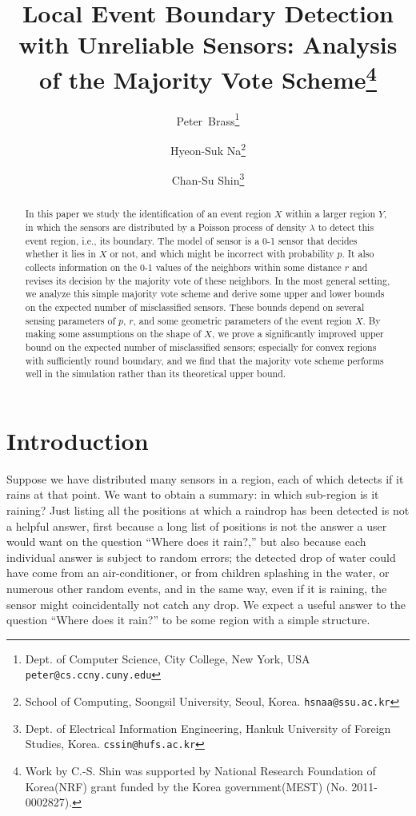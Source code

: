 \documentclass{article}
\begin{document}
\title{
Local Event Boundary Detection with Unreliable Sensors:
Analysis of the Majority Vote Scheme\thanks{Work by C.-S. Shin was supported by National Research Foundation of Korea(NRF) grant funded by the Korea government(MEST) (No. 2011-0002827).}}


\author{
	Peter~Brass\thanks{Dept. of Computer Science, City College, New York, USA \tt{peter@cs.ccny.cuny.edu}} \and 
	Hyeon-Suk Na\thanks{School of Computing, Soongsil University, Seoul, Korea. \tt{hsnaa@ssu.ac.kr}} 
	\and Chan-Su Shin\thanks{Dept. of Electrical Information Engineering, Hankuk University of Foreign Studies, Korea. \tt{cssin@hufs.ac.kr}}
}
\date{}
\maketitle

\begin{abstract}
In this paper we study the identification of an event region $X$ within a
larger region $Y$, in which the sensors are distributed by a Poisson process
of density $\lambda$ to detect this event region, i.e., its boundary. The model of sensor is a 0-1
sensor that decides whether it lies in $X$ or not, and which might be
incorrect with probability $p$. It also collects information on the
0-1 values of the neighbors within some distance $r$ and revises its
decision by the majority vote of these neighbors. In the most general setting, we analyze this simple majority vote scheme
and derive some upper and lower bounds on the expected number of misclassified
sensors. These bounds depend on several sensing parameters of $p$, $r$, and some geometric parameters of the event region $X$. By making some assumptions on the shape of $X$, we prove a significantly improved upper bound on the expected number of misclassified sensors; especially for convex regions with sufficiently round boundary, and we find that the majority vote scheme performs well in the simulation rather than its theoretical upper bound.
\end{abstract}




\section{Introduction}
Suppose we have distributed many sensors in a region, each of which detects
if it rains at that point. We want to obtain a summary: in which sub-region
is it raining? Just listing all the positions at which a raindrop has been
detected is not a helpful answer, first because a long list of positions
is not the answer a user would want on the question ``Where does it rain?,''
but also because each individual answer is subject to random
errors; the detected drop of water could have come from an air-conditioner,
or from children splashing in the water, or numerous other random events,
and in the same way, even if it is raining, the sensor might coincidentally
not catch any drop. We expect a useful answer to the question ``Where does it rain?'' to be some region with a simple structure.
\end{document}
